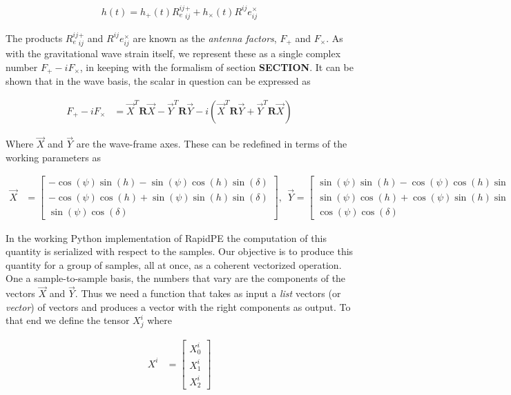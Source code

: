 \begin{align}
h(t) = h_{+}(t)R^{ij}_e^+_{ij} + h_{\times}(t)R^{ij}e^{\times}_{ij}
\end{align}

The products $R^{ij}_e^+_{ij}$ and $R^{ij}e^{\times}_{ij}$ are known as the \textit{antenna factors}, $F_{+}$ and $F_{\times}$. As with the gravitational wave strain itself, we represent these as a single complex number $F_{+} - i F_{\times}$, in keeping with the formalism of section \textbf{SECTION}. It can be shown that in the wave basis, the scalar in question can be expressed as  

\begin{align}
F_+ - i F_{\times} &= \vec{X}^T\mathbf{R}\vec{X} - \vec{Y}^T\mathbf{R}\vec{Y} - i(\vec{X}^T\mathbf{R}\vec{Y} + \vec{Y}^T\mathbf{R}\vec{X})
\end{align} 

Where $\vec{X}$ and $\vec{Y}$ are the wave-frame axes. These can be redefined \cite{antennafacdefn} in terms of the working parameters as 

\begin{align}
\vec{X} &=
\begin{bmatrix}
-\cos(\psi)\sin(h) - \sin(\psi)\cos(h)\sin(\delta) \\
-\cos(\psi)\cos(h) + \sin(\psi)\sin(h)\sin(\delta) \\
\sin(\psi)\cos(\delta)
\end{bmatrix}
, \ \ \vec{Y} = 
\begin{bmatrix}
\sin(\psi)\sin(h) - \cos(\psi)\cos(h)\sin(\delta) \\
\sin(\psi)\cos(h) + \cos(\psi)\sin(h)\sin(\delta) \\
\cos(\psi)\cos(\delta)
\end{bmatrix}
\end{align}
 
In the working Python implementation of RapidPE the computation of this quantity is serialized with respect to the samples. Our objective is to produce this quantity for a group of samples, all at once, as a coherent vectorized operation. One a sample-to-sample basis, the numbers that vary are the components of the vectors $\vec{X}$ and $\vec{Y}$. Thus we need a function that takes as input a \textit{list} vectors (or \textit{vector}) of vectors and produces a vector with the right components as output. To that end we define the tensor $X^{i}_{j}$ where

\begin{align}
X^i &= 
\begin{bmatrix}
X^{i}_0 \\
X^{i}_1 \\
X^{i}_2
\end{bmatrix}
\end{align}

